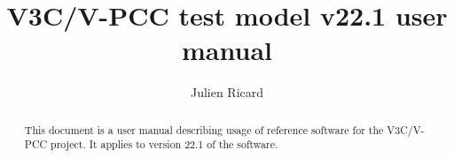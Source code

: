 \documentclass[a4paper,11pt]{mpegdoc}
\title{V3C/V-PCC test model v22.1 user manual}
\author{%
	Julien Ricard
	\email{julien.ricard@interdigital.com}
}
\begin{document}
\maketitle
\begin{abstract}
This document is a user manual describing usage of reference software
for the V3C/V-PCC project. It applies to version 22.1 of the software.
\end{abstract}

\tableofcontents









%
\end{document}

